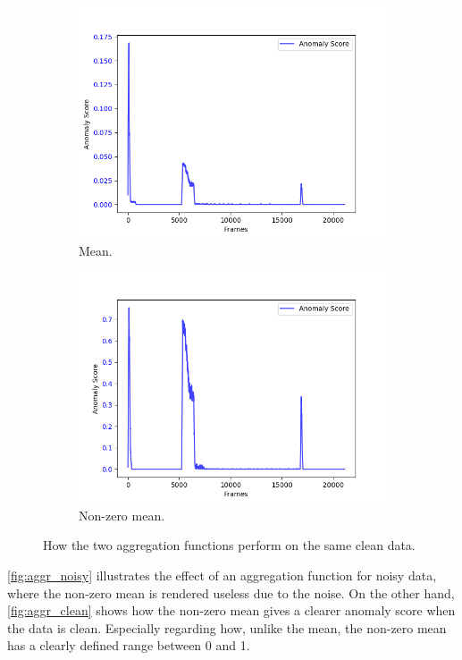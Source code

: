 \begin{figure}[H]
    \centering
    \begin{subfigure}[t]{0.5\textwidth}
        \centering
        \includegraphics[width=\textwidth]{resources/methodology/aggr_clean_mean.png}
        \caption{Mean.}

    \end{subfigure}%
    \begin{subfigure}[t]{0.5\textwidth}
        \centering
        \includegraphics[width=\textwidth]{resources/methodology/aggr_clean_nzmean.png}
        \caption{Non-zero mean.}
    \end{subfigure}
    \caption[Aggregation Functions on Clean Data]{How the two aggregation functions perform on the same clean data.}
    \label{fig:aggr_clean}
\end{figure}
\autoref{fig:aggr_noisy} illustrates the effect of an aggregation function for noisy data, where the non-zero mean is rendered useless due to the noise. On the other hand, \autoref{fig:aggr_clean} shows how the non-zero mean gives a clearer anomaly score when the data is clean. Especially regarding how, unlike the mean, the non-zero mean has a clearly defined range between 0 and 1.
